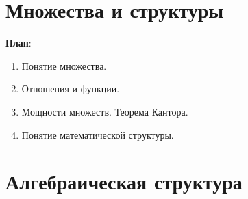 

\section{Множества и структуры}



\textbf{План}:
\begin{enumerate}
\item Понятие множества.
\item Отношения и функции.
\item Мощности множеств. Теорема Кантора.
\item Понятие математической структуры.
\end{enumerate}

\section{Алгебраическая структура}
